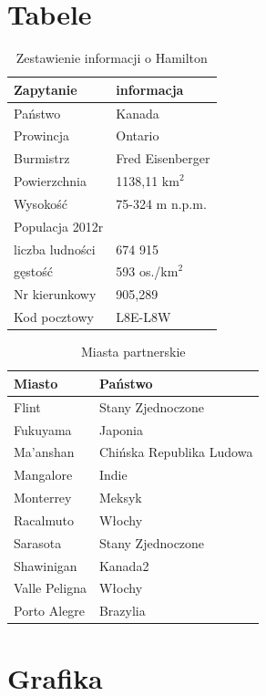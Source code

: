 \documentclass[a4paper,12pt]{article}
\begin{document}
\section{Tabele}
\begin{table}[h]
\centering
\begin{tabular}{ll}
\textbf{Zapytanie}&\textbf{informacja}\\
\hline
Państwo&Kanada\\
Prowincja&Ontario\\
Burmistrz&Fred Eisenberger\\
Powierzchnia&1138{,}11 $\textrm{km}^2$\\
Wysokość&75-324 m n.p.m.\\
Populacja 2012r&\\
 liczba ludności&674 915\\
 gęstość&593 os./$\textrm{km}^2$\\
Nr kierunkowy&905{,}289\\
Kod pocztowy&L8E-L8W\\
\hline
\end{tabular}
\caption{Zestawienie informacji o Hamilton}
\end{table}

\begin{table}[h]
\centering
\begin{tabular}{ll}
\textbf{Miasto}&\textbf{Państwo}\\
\hline
Flint&Stany Zjednoczone\\
Fukuyama&Japonia\\
Ma’anshan&Chińska Republika Ludowa\\
Mangalore&Indie\\
Monterrey&Meksyk\\
Racalmuto&Włochy\\
Sarasota&Stany Zjednoczone\\
Shawinigan&Kanada2\\
Valle Peligna&Włochy\\
Porto Alegre&Brazylia\\
\hline
\end{tabular}
\caption{Miasta partnerskie} \label{table:miasta}
\end{table}

\section{Grafika}
\end{document}
